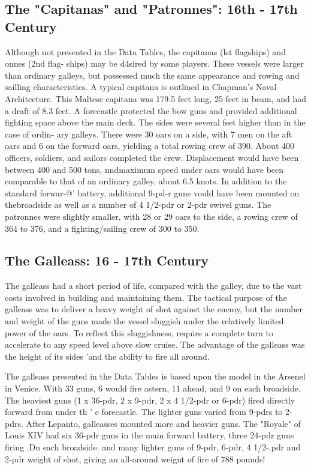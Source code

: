 \documentclass{article}
\begin{document}
\begin{multicols}{2}
\subsection{The "Capitanas" and "Patronnes":  16th - 17th Century}

Although not presented in the Data Tables, the capitanas (lst
flagships) and onnes (2nd flag- ships) may be d4sired by some players.
These vessels were larger than ordinary galleys, but
possessed much the same appearance and rowing and sailling
characteristics.  A typical capitana is outlined in Chapman's Naval
Architecture. This Maltese capitana was 179.5 feet long, 25 feet in
beam, and had a draft of 8.3 feet. A forecastle protected the bow guns
and provided additional fighting space above the main deck. The sides
were several feet higher than in the case of ordin- ary galleys. There
were 30 oars on a side, with 7 men on the aft oars and 6 on the
forward oars, yielding a total rowing crew of 390.  About 400
officers, soldiers, and sailors completed the crew. Displacement would
have been between 400 and 500 tons, nndmaximum speed under oars would
have been comparable to that of an ordinary galley, about 6.5
knots. In addition to the standard forwar-@' battery, additional
9-pd-r guns vould have been mounted on thebroadside as well as a
number of 4 1/2-pdr or 2-pdr swivel guns.  The patronnes were slightly
smaller, with 28 or 29 oars to the side, a rowing crew of 364 to 376,
and a fighting/sailing crew of 300 to 350.

\subsection{The Galleass:  16 - 17th Century}

The galleass had a short period of life, compared with the galley, due
to the vast costs involved in building and maintaining them.  The
tactical purpose of the galleass was to deliver a heavy weight of shot
against the enemy, but the number and weight of the guns made the
vessel sluggish under the relatively limited power of the oars. To
reflect this sluggishness, require a complete turn to accelerate to
any speed level above slow cruise.  The advantage of the galleass was
the height of its sides 'and the ability to fire all around.

The galleass presented in the Data Tables is based upon the model in
the Arsenel in Venice.  With 33 guns, 6 would fire astern, 11 ahead,
and 9 on each broadside.  The heaviest guns (1 x 36-pdr, 2 x 9-pdr, 2
x 4 1/2-pdr or 6-pdr) fired directly forward from under th ' e
forecastle.  The lighter guns varied from 9-pdrs to 2-pdrs. After
Lepanto, galleasses mounted more and heavier guns.  The "Royale" of
Louis XIV had six 36-pdr guns in the main forward battery, three
24-pdr guns firing .Dn each broadside. and many lighter guns of 9-pdr,
6-pdr, 4 1/2-.pdr and 2-pdr weight of shot, giving an all-around
weignt of fire of 788 pounds!


\end{multicols}
\end{document}
